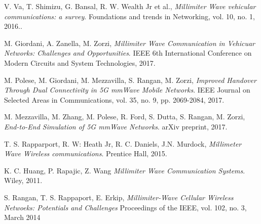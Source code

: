 \documentclass[conference,10pt]{IEEEtran}
\begin{document}
\begin{thebibliography}{15}
	
	V. Va, T. Shimizu, G. Bansal, R. W. Wealth Jr et al.,
	\textit{Millimiter Wave vehicular communications: a survey}. 
	Foundations and trends in Networking, vol. 10, no. 1, 2016..
	
	M. Giordani, A. Zanella, M. Zorzi,
	\textit{Millimiter Wave Communication in Vehicuar Networks: Challenges and Opportunities}. 
	IEEE 6th International Conference on Modern Circuits and System Technologies, 2017.
	
	M. Polese, M. Giordani, M. Mezzavilla, S. Rangan, M. Zorzi,
	\textit{Improved Handover Through Dual Connectivity in 5G mmWave Mobile Networks}. 
	IEEE Journal on Selected Areas in Communications, vol. 35, no. 9, pp. 2069-2084, 2017.
	
	M. Mezzavilla, M. Zhang, M. Polese, R. Ford, S. Dutta, S. Rangan, M. Zorzi,
	\textit{End-to-End Simulation of 5G mmWave Networks}. 
	arXiv preprint, 2017.
	
	T. S. Rapparport, R. W: Heath Jr, R. C. Daniels, J.N. Murdock,
	\textit{Millimeter Wave Wireless communications}.
	Prentice Hall, 2015.
	
	K. C. Huang, P. Rapajic, Z. Wang
	\textit{Millimiter Wave Communication Systems}.
	Wiley, 2011.
	
	S. Rangan, T. S. Rappaport, E. Erkip,
	\textit{Millimiter-Wave Cellular Wireless Netwoeks: Potentials and Challenges}
	Proceedings of the IEEE, vol. 102, no. 3, March 2014
	
\end{thebibliography}
\end{document}
